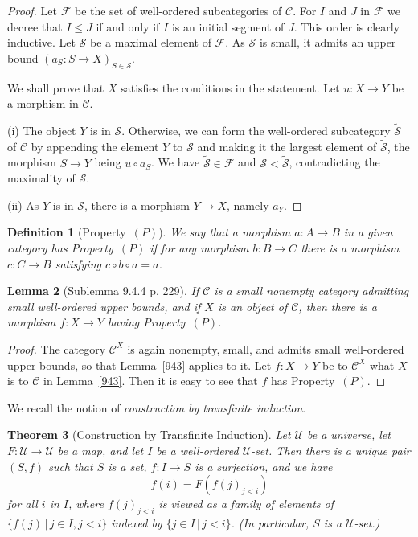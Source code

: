 \documentclass[12pt]{article}
\newtheorem{thm}{Theorem}
\newtheorem{lem}[thm]{Lemma}
\newtheorem{df}[thm]{Definition}
\theoremstyle{remark}
\theoremstyle{definition}
\newcommand{\nn}{\noindent}
\newcommand{\cc}{\mathcal}
\newcommand{\C}{\mathcal C}
\newcommand{\U}{\mathcal U}
\begin{document}
\begin{proof}
Let $\cc F$ be the set of well-ordered subcategories of $\C$. For $I$ and $J$ in $\cc F$ we decree that $I\le J$ if and only if $I$ is an initial segment of $J$. This order is clearly inductive. Let $\cc S$ be a maximal element of $\cc F$. As $\cc S$ is small, it admits an upper bound $(a_S:S\to X)_{S\in\cc S}$. 

We shall prove that $X$ satisfies the conditions in the statement. Let $u:X\to Y$ be a morphism in $\C$. 

\nn(i) The object $Y$ is in $\cc S$. Otherwise, we can form the well-ordered subcategory $\widetilde{\cc S}$ of $\C$ by appending the element $Y$ to $\cc S$ and making it the largest element of $\widetilde{\cc S}$, the morphism $S\to Y$ being $u\circ a_S$. We have $\widetilde{\cc S}\in\cc F$ and $\cc S<\widetilde{\cc S}$, contradicting the maximality of $\cc S$. 

\nn(ii) As $Y$ is in $\cc S$, there is a morphism $Y\to X$, namely $a_Y$.
\end{proof} 

\begin{df}[Property~$(P)$]\label{pofa} 
We say that a morphism $a:A\to B$ in a given category has \emph{Property}~$(P)$ if for any morphism $b:B\to C$ there is a morphism $c:C\to B$ satisfying $c\circ b\circ a=a$.  
\end{df}  

\begin{lem}[Sublemma 9.4.4 p. 229]\label{944} 
If $\C$ is a small nonempty category admitting small well-ordered upper bounds, and if $X$ is an object of $\C$, then there is a morphism $f:X\to Y$ having Property~$(P)$.
\end{lem}

\begin{proof}
The category $\C^X$ is again nonempty, small, and admits small well-ordered upper bounds, so that Lemma~\ref{943} applies to it. Let $f:X\to Y$ be to $\C^X$ what $X$ is to $\C$ in Lemma~\ref{943}. Then it is easy to see that $f$ has Property~$(P)$. 
\end{proof}

We recall the notion of {\em construction by transfinite induction}. 

\begin{thm}[Construction by Transfinite Induction]\label{meta} 
Let $\U$ be a universe, let $F:\U\to\U$ be a map, and let $I$ be a well-ordered $\U$-set. Then there is a unique pair $(S,f)$ such that $S$ is a set, $f:I\to S$ is a surjection, and we have 
$$
f(i)=F(f(j)_{j<i})
$$ 
for all $i$ in $I$, where $f(j)_{j<i}$ is viewed as a family of elements of $\{f(j)\,|\,j\in I,j<i\}$ indexed by $\{j\in I\,|\,j<i\}$. (In particular, $S$ is a $\U$-set.)
\end{thm}
\end{document}
